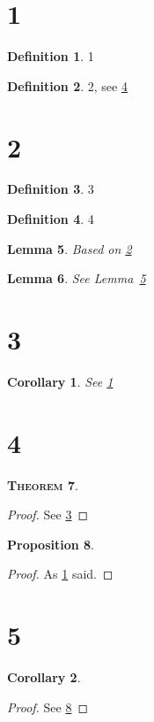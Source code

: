 \documentclass{article}
\newtheorem{thm}{\textsc{Theorem}}[subsection]
\newtheorem{lem}[thm]{Lemma}
\newtheorem{prop}[thm]{Proposition}
\newtheorem{cor}{Corollary}[thm]
\theoremstyle{definition}
\newtheorem{defn}[thm]{Definition}
\newcommand{\fref}[1]{\ref{#1}}
\newcommand{\reflem}[1]{Lemma~\ref{#1}}
\begin{document}
\section{1}

\begin{defn}
	\label{def:1}
	1
\end{defn}

\begin{defn}
        \label{def:2}
        2, see \fref{def:4}
\end{defn}

\section{2}

\begin{defn}
	\label{def:3}
	3
\end{defn}

\begin{defn}
        \label{def:4}
        4
\end{defn}

\begin{lem}
        \label{lem:bar}
        Based on \ref{def:2}
\end{lem}

\begin{lem}
        \label{lem:foo}
        See \reflem{lem:bar}
\end{lem}

\section{3}

\begin{cor}
	\label{cor:back1}
	See \ref{def:1}
\end{cor}

\section{4}

\begin{thm}
	\label{thm:back3}
\end{thm}
\begin{proof}
	See \ref{def:3}
\end{proof}

\begin{prop}
	\label{prop:backcor}
\end{prop}
\begin{proof}
	As \ref{cor:back1} said.
\end{proof}

\section{5}
\begin{cor}
	\label{cor:backprop}
\end{cor}
\begin{proof}
	See \ref{prop:backcor}
\end{proof}
\end{document}
